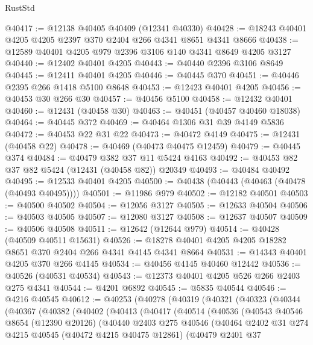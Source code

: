 \begin{lexlean}{RustStd}
\begin{coremodule}
@40417 := @12138 @40405 @40409 (@12341 @40330)
@40428 := @18243 @40401 @4205 @4205 @2397 @370 @2404 @266 @4341 @8651 @4341 @8666
@40438 := @12589 @40401 @4205 @979 @2396 @3106 @140 @4341 @8649 @4205 @3127
@40440 := @12402 @40401 @4205
@40443 := @40440 @2396 @3106 @8649
@40445 := @12411 @40401 @4205
@40446 := @40445 @370
@40451 := @40446 @2395 @266 @1418 @5100 @8648
@40453 := @12423 @40401 @4205
@40456 := @40453 @30 @266 @30
@40457 := @40456 @5100
@40458 := @12432 @40401
@40460 := @12431 (@40458 @30)
@40463 := @40451 (@40457 @40460 @18038)
@40464 := @40445 @372
@40469 := @40464 @1306 @31 @39 @4149 @5836
@40472 := @40453 @22 @31 @22
@40473 := @40472 @4149
@40475 := @12431 (@40458 @22)
@40478 := @40469 (@40473 @40475 @12459)
@40479 := @40445 @374
@40484 := @40479 @382 @37 @11 @5424 @4163
@40492 := @40453 @82 @37 @82 @5424 (@12431 (@40458 @82)) @20349
@40493 := @40484 @40492
@40495 := @12533 @40401 @4205
@40500 := @40438 (@40443 (@40463 (@40478 (@40493 @40495))))
@40501 := @11986 @979
@40502 := @12182 @40501
@40503 := @40500 @40502
@40504 := @12056 @3127
@40505 := @12633 @40504
@40506 := @40503 @40505
@40507 := @12080 @3127
@40508 := @12637 @40507
@40509 := @40506 @40508
@40511 := @12642 (@12644 @979)
@40514 := @40428 (@40509 @40511 @15631)
@40526 := @18278 @40401 @4205 @4205 @18282 @8651 @370 @2404 @266 @4341 @4145 @4341 @8664
@40531 := @14343 @40401 @4205 @370 @266 @4145
@40534 := @40456 @4145 @40460 @12442
@40536 := @40526 (@40531 @40534)
@40543 := @12373 @40401 @4205 @526 @266 @2403 @275 @4341
@40544 := @4201 @6892
@40545 := @5835 @40544
@40546 := @4216 @40545
@40612 := @40253
    (@40278
      (@40319
        (@40321
          (@40323
            (@40344
              (@40367
                (@40382
                  (@40402
                    (@40413
                      (@40417
                        (@40514
                          (@40536
                            (@40543
                              @40546
                              @8654
                              (@12390 @20126)
                              (@40440
                                @2403
                                @275
                                @40546
                                (@40464
                                  @2402
                                  @31
                                  @274
                                  @4215
                                  @40545
                                  (@40472 @4215 @40475 @12861)
                                  (@40479
                                    @2401
                                    @37

\end{coremodule}
\end{lexlean}
